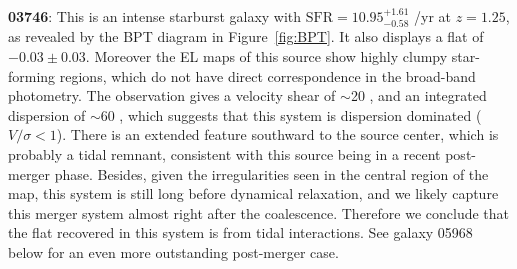 {\bf 03746}: This is an intense starburst galaxy with $\textrm{SFR}=10.95_{-0.58}^{+1.61}$
\Msun/yr at $z=1.25$, as revealed by the BPT diagram in Figure~\ref{fig:BPT}. It also
displays a flat \mg of $-0.03\pm0.03$.  Moreover the EL maps of this source show highly
clumpy star-forming regions, which do not have direct correspondence in the broad-band
photometry.  The \muse observation gives a velocity shear of $\sim$20 \kms, and an integrated
dispersion of $\sim$60 \kms, which suggests that this system is dispersion dominated
($V/\sigma<1$).  There is an extended feature southward to the source center, which is
probably a tidal remnant, consistent with this source being in a recent post-merger phase.
Besides, given the irregularities seen in the central region of the \Mstar map, this system
is still long before dynamical relaxation, and we likely capture this merger system almost
right after the coalescence.  Therefore we conclude that the flat \mg recovered in this
system is from tidal interactions. See galaxy 05968 below for an even more outstanding
post-merger case.

